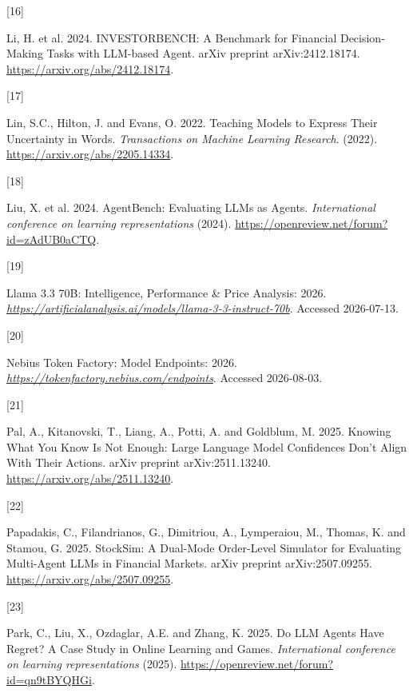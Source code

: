 \documentclass[
  11pt,
]{article}
\newlength{\cslhangindent}
\newlength{\csllabelwidth}
\newenvironment{CSLReferences}[2] %
 {\begin{list}{}{%
  \setlength{\itemindent}{0pt}
  \setlength{\leftmargin}{0pt}
  \setlength{\parsep}{0pt}
  \ifodd #1
   \setlength{\leftmargin}{\cslhangindent}
   \setlength{\itemindent}{-1\cslhangindent}
  \fi
  \setlength{\itemsep}{#2\baselineskip}}}
 {\end{list}}
\newcommand{\CSLLeftMargin}[1]{\parbox[t]{\csllabelwidth}{\strut#1\strut}}
\newcommand{\CSLRightInline}[1]{\parbox[t]{\linewidth - \csllabelwidth}{\strut#1\strut}}
\begin{document}
\begin{CSLReferences}{0}{0}
\CSLLeftMargin{{[}16{]} }%
\CSLRightInline{Li, H. et al. 2024. {INVESTORBENCH: A Benchmark for Financial Decision-Making Tasks with LLM-based Agent}. arXiv preprint arXiv:2412.18174. \url{https://arxiv.org/abs/2412.18174}.}

\CSLLeftMargin{{[}17{]} }%
\CSLRightInline{Lin, S.C., Hilton, J. and Evans, O. 2022. {Teaching Models to Express Their Uncertainty in Words}. \emph{Transactions on Machine Learning Research}. (2022). \url{https://arxiv.org/abs/2205.14334}.}

\CSLLeftMargin{{[}18{]} }%
\CSLRightInline{Liu, X. et al. 2024. {AgentBench: Evaluating LLMs as Agents}. \emph{International conference on learning representations} (2024). \url{https://openreview.net/forum?id=zAdUB0aCTQ}.}

\CSLLeftMargin{{[}19{]} }%
\CSLRightInline{{Llama 3.3 70B: Intelligence, Performance \& Price Analysis}: 2026. \href{https://artificialanalysis.ai/models/llama-3-3-instruct-70b}{\emph{https://artificialanalysis.ai/models/llama-3-3-instruct-70b}}. Accessed 2026-07-13.}

\CSLLeftMargin{{[}20{]} }%
\CSLRightInline{{Nebius Token Factory: Model Endpoints}: 2026. \href{https://tokenfactory.nebius.com/endpoints}{\emph{https://tokenfactory.nebius.com/endpoints}}. Accessed 2026-08-03.}

\CSLLeftMargin{{[}21{]} }%
\CSLRightInline{Pal, A., Kitanovski, T., Liang, A., Potti, A. and Goldblum, M. 2025. {Knowing What You Know Is Not Enough: Large Language Model Confidences Don't Align With Their Actions}. arXiv preprint arXiv:2511.13240. \url{https://arxiv.org/abs/2511.13240}.}

\CSLLeftMargin{{[}22{]} }%
\CSLRightInline{Papadakis, C., Filandrianos, G., Dimitriou, A., Lymperaiou, M., Thomas, K. and Stamou, G. 2025. {StockSim: A Dual-Mode Order-Level Simulator for Evaluating Multi-Agent LLMs in Financial Markets}. arXiv preprint arXiv:2507.09255. \url{https://arxiv.org/abs/2507.09255}.}

\CSLLeftMargin{{[}23{]} }%
\CSLRightInline{Park, C., Liu, X., Ozdaglar, A.E. and Zhang, K. 2025. {Do LLM Agents Have Regret? A Case Study in Online Learning and Games}. \emph{International conference on learning representations} (2025). \url{https://openreview.net/forum?id=qn9tBYQHGi}.}


\end{CSLReferences}
\end{document}
